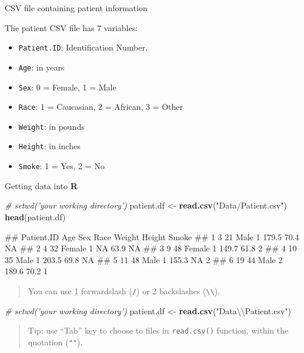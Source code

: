 \documentclass[ignorenonframetext,]{beamer}
\newenvironment{Shaded}{\begin{snugshade}}{\end{snugshade}}
\newcommand{\KeywordTok}[1]{\textcolor[rgb]{0.13,0.29,0.53}{\textbf{#1}}}
\newcommand{\CharTok}[1]{\textcolor[rgb]{0.31,0.60,0.02}{#1}}
\newcommand{\StringTok}[1]{\textcolor[rgb]{0.31,0.60,0.02}{#1}}
\newcommand{\CommentTok}[1]{\textcolor[rgb]{0.56,0.35,0.01}{\textit{#1}}}
\newcommand{\NormalTok}[1]{#1}
\providecommand{\tightlist}{%
  \setlength{\itemsep}{0pt}\setlength{\parskip}{0pt}}
\let\oldShaded\Shaded
\let\endoldShaded\endShaded
\renewenvironment{Shaded}{\footnotesize\oldShaded}{\endoldShaded}
\let\oldverbatim\verbatim
\let\endoldverbatim\endverbatim
\renewenvironment{verbatim}{\footnotesize\oldverbatim}{\endoldverbatim}
\begin{document}
\begin{frame}[fragile]{CSV file containing patient information}

The patient CSV file has 7 variables:

\begin{itemize}
\tightlist
\item
  \texttt{Patient.ID}: Identification Number.
\item
  \texttt{Age}: in years
\item
  \texttt{Sex}: 0 = Female, 1 = Male
\item
  \texttt{Race}: 1 = Caucasian, 2 = African, 3 = Other
\item
  \texttt{Weight}: in pounds
\item
  \texttt{Height}: in inches
\item
  \texttt{Smoke}: 1 = Yes, 2 = No
\end{itemize}

\end{frame}

\begin{frame}[fragile]{Getting data into \textbf{R}}

\begin{Shaded}
\begin{Highlighting}[]
\CommentTok{# setwd('your working directory')}
\NormalTok{patient.df <-}\StringTok{ }\KeywordTok{read.csv}\NormalTok{(}\StringTok{"Data/Patient.csv"}\NormalTok{)}
\KeywordTok{head}\NormalTok{(patient.df)}
\end{Highlighting}
\end{Shaded}

\begin{verbatim}
##   Patient.ID Age    Sex Race Weight Height Smoke
## 1          3  21   Male    1  179.5   70.4    NA
## 2          4  32 Female    1     NA   63.9    NA
## 3          9  48 Female    1  149.7   61.8     2
## 4         10  35   Male    1  203.5   69.8    NA
## 5         11  48   Male    1  155.3     NA     2
## 6         19  44   Male    2  189.6   70.2     1
\end{verbatim}

\begin{quote}
You can use 1 forwardslash (\texttt{/}) or 2 backslashes
(\texttt{\textbackslash{}\textbackslash{}}).
\end{quote}

\begin{Shaded}
\begin{Highlighting}[]
\CommentTok{# setwd('your working directory')}
\NormalTok{patient.df <-}\StringTok{ }\KeywordTok{read.csv}\NormalTok{(}\StringTok{"Data}\CharTok{\textbackslash{}\textbackslash{}}\StringTok{Patient.csv"}\NormalTok{)}
\end{Highlighting}
\end{Shaded}

\begin{quote}
Tip: use ``Tab'' key to choose to files in \texttt{read.csv()} function,
within the quotation (\texttt{""}).
\end{quote}

\end{frame}
\end{document}
